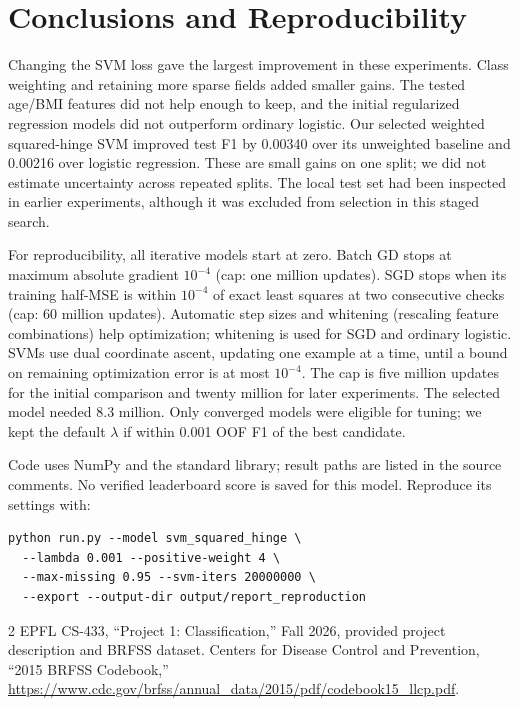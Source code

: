 \documentclass[10pt,conference,compsocconf,a4paper]{latex-example-paper/IEEEtran}
\begin{document}
\section{Conclusions and Reproducibility}
Changing the SVM loss gave the largest improvement in these experiments.
Class weighting and retaining more sparse fields added smaller gains.
The tested age/BMI features did not help enough to keep, and the initial
regularized regression models did not outperform ordinary logistic.
Our selected weighted squared-hinge SVM improved test F1 by 0.00340 over
its unweighted baseline and 0.00216 over logistic regression. These are
small gains on one split; we did not estimate uncertainty across repeated
splits. The local test set had been inspected in earlier experiments,
although it was excluded from selection in this staged search.

For reproducibility, all iterative models start at zero. Batch GD stops
at maximum absolute gradient $10^{-4}$ (cap: one million updates).
SGD stops when its training half-MSE is within $10^{-4}$ of exact least
squares at two consecutive checks (cap: 60 million updates).
Automatic step sizes and whitening (rescaling feature combinations)
help optimization; whitening is used for SGD and ordinary logistic. SVMs use dual coordinate ascent, updating one example at a time, until
a bound on remaining optimization error is at most $10^{-4}$.
The cap is five million updates for the initial comparison and twenty
million for later experiments. The selected model needed 8.3 million.
Only converged models were eligible for tuning; we kept the default
$\lambda$ if within 0.001 OOF F1 of the best candidate.

Code uses NumPy and the standard library; result paths are listed in the
source comments. No verified leaderboard score is saved for this model.
Reproduce its settings with:
\begin{lstlisting}
python run.py --model svm_squared_hinge \
  --lambda 0.001 --positive-weight 4 \
  --max-missing 0.95 --svm-iters 20000000 \
  --export --output-dir output/report_reproduction
\end{lstlisting}

\begin{thebibliography}{2}
 EPFL CS-433, ``Project 1: Classification,'' Fall 2026,
provided project description and BRFSS dataset.
\bibitem{codebook} Centers for Disease Control and Prevention,
``2015 BRFSS Codebook,''
\url{https://www.cdc.gov/brfss/annual_data/2015/pdf/codebook15_llcp.pdf}.
\end{thebibliography}
\end{document}
